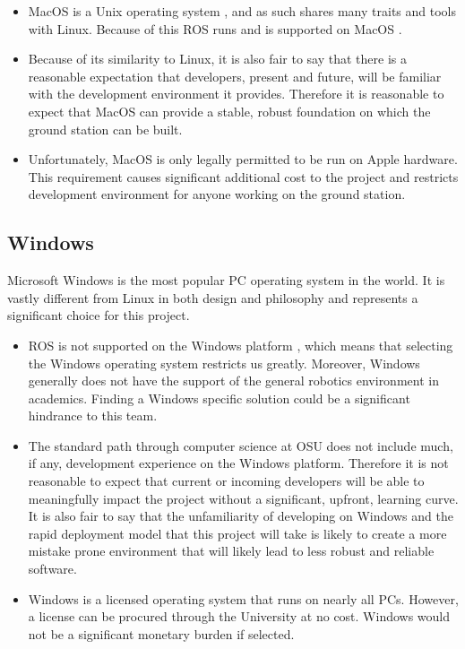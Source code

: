 \documentclass[onecolumn, draftclsnofoot, 10pt, compsoc]{IEEEtran}
\begin{document}
\begin{itemize}
\item 
MacOS is a Unix operating system \cite{macunix}, and as such shares many traits and tools with Linux.
Because of this ROS runs and is supported on MacOS \cite{rossupport}.

\item
Because of its similarity to Linux, it is also fair to say that there is a reasonable expectation that developers, present and future, will be familiar with the development environment it provides.
Therefore it is reasonable to expect that MacOS can provide a stable, robust foundation on which the ground station can be built.

\item
Unfortunately, MacOS is only legally permitted to be run on Apple hardware.
This requirement causes significant additional cost to the project and restricts development environment for anyone working on the ground station.

\end{itemize}

\subsection{Windows}
Microsoft Windows is the most popular PC operating system in the world.
It is vastly different from Linux in both design and philosophy and represents a significant choice for this project.

\begin{itemize}
\item 
ROS is not supported on the Windows platform \cite{rossupport}, which means that selecting the Windows operating system restricts us greatly.
Moreover, Windows generally does not have the support of the general robotics environment in academics.
Finding a Windows specific solution could be a significant hindrance to this team.

\item
The standard path through computer science at OSU does not include much, if any, development experience on the Windows platform.
Therefore it is not reasonable to expect that current or incoming developers will be able to meaningfully impact the project without a significant, upfront, learning curve.
It is also fair to say that the unfamiliarity of developing on Windows and the rapid deployment model that this project will take is likely to create a more mistake prone environment that will likely lead to less robust and reliable software.

\item
Windows is a licensed operating system that runs on nearly all PCs.
However, a license can be procured through the University at no cost.
Windows would not be a significant monetary burden if selected.

\end{itemize}
\end{document}

